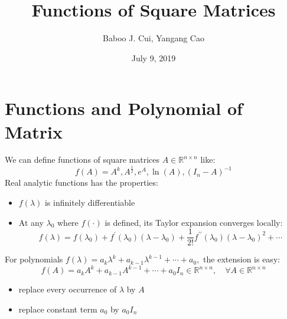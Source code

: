 \documentclass[10pt,a4paper,oneside]{article}
\date{July 9, 2019}
\author{Baboo J. Cui, Yangang Cao}
\title{Functions of Square Matrices}
\begin{document}
\maketitle
\tableofcontents

\newpage
\section{Functions and Polynomial of Matrix}
We can define functions of square matrices $A \in \mathbb{R}^{n \times n}$ like:
\[
f(A)=A^{k}, A^{\frac{1}{2}}, e^{A}, \ln (A),\left(I_{n}-A\right)^{-1}
\]
Real analytic functions has the properties:
\begin{itemize}
\item $f(\lambda)$ is infinitely differentiable
\item At any $\lambda_{0}$ where $f(\cdot)$ is defined, its Taylor expansion converges locally:
\[
f(\lambda)=f\left(\lambda_{0}\right)+f^{\prime}\left(\lambda_{0}\right)\left(\lambda-\lambda_{0}\right)+\frac{1}{2 !} f^{\prime \prime}\left(\lambda_{0}\right)\left(\lambda-\lambda_{0}\right)^{2}+\cdots
\]
\end{itemize}
For polynomials $f(\lambda)=a_{k} \lambda^{k}+a_{k-1} \lambda^{k-1}+\cdots+a_{0},$ the extension is easy:
\[
f(A)=a_{k} A^{k}+a_{k-1} A^{k-1}+\cdots+a_{0} I_{n} \in \mathbb{R}^{n \times n}, \quad \forall A \in \mathbb{R}^{n \times n}
\]
\begin{itemize}
\item replace every occurrence of $\lambda$ by $A$
\item replace constant term $a_0$ by $a_0 I_n$
\end{itemize}
\end{document}
